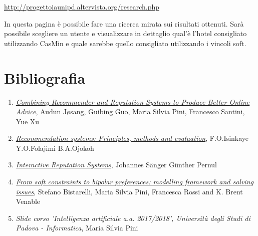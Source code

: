 \documentclass{report}
\begin{document}
	\url{http://progettoiaunipd.altervista.org/research.php}
	\newline
	
	In questa pagina è possibile fare una ricerca mirata sui risultati ottenuti. Sarà possibile scegliere un utente e visualizzare in dettaglio qual'è l'hotel consigliato utilizzando CasMin e quale sarebbe quello consigliato utilizzando i vincoli soft.
	
	
	\hypertarget{header-n287}{%
		\section{Bibliografia}\label{header-n287}}
	
	\begin{enumerate}
		\item
		\href{https://www.researchgate.net/publication/262187804_Combining_Recommender_and_Reputation_Systems_to_Produce_Better_Online_Advice}{\textit{Combining Recommender and Reputation Systems to Produce Better Online Advice}}, Audun Jøsang, Guibing Guo, Maria Silvia Pini, Francesco Santini, Yue Xu
		\item \href{https://www.sciencedirect.com/science/article/pii/S1110866515000341}{\textit{Recommendation systems: Principles, methods and evaluation}}, F.O.Isinkaye Y.O.Folajimi B.A.Ojokoh
		\item 
		\href{https://link.springer.com/article/10.1007/s12599-017-0493-1}{\textit{Interactive Reputation Systems}}, Johannes Sänger Günther Pernul
		\item 
		\href{http://www.math.unipd.it/~frossi/jbip8-jetai.pdf}{\textit{From soft constraints to bipolar preferences: modelling framework and solving issues}}, Stefano Bistarelli, Maria Silvia Pini, Francesca Rossi and K. Brent Venable
		\item
		\textit{Slide corso 'Intelligenza artificiale a.a. 2017/2018', Università degli Studi di Padova - Informatica}, Maria Silvia Pini
	\end{enumerate}
	
\end{document}
